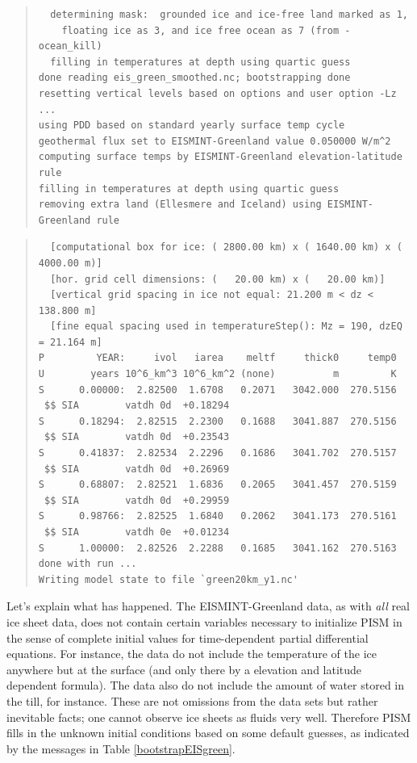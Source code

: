 \documentclass[11pt,final]{amsart}
\begin{document}
\begin{table}
\begin{quote}
\begin{verbatim}
  determining mask:  grounded ice and ice-free land marked as 1,
    floating ice as 3, and ice free ocean as 7 (from -ocean_kill)
  filling in temperatures at depth using quartic guess
done reading eis_green_smoothed.nc; bootstrapping done
resetting vertical levels based on options and user option -Lz ...
using PDD based on standard yearly surface temp cycle
geothermal flux set to EISMINT-Greenland value 0.050000 W/m^2
computing surface temps by EISMINT-Greenland elevation-latitude rule
filling in temperatures at depth using quartic guess
removing extra land (Ellesmere and Iceland) using EISMINT-Greenland rule
\end{verbatim}
\end{quote}
\normalsize
\bigskip

\caption{Bootstrapping from the EISMINT-Greenland data and running for one model year continued on next page.}
\label{bootstrapEISgreen}
\end{table}

\begin{table}
\scriptsize
\begin{quote}
\begin{verbatim}
  [computational box for ice: ( 2800.00 km) x ( 1640.00 km) x ( 4000.00 m)]
  [hor. grid cell dimensions: (   20.00 km) x (   20.00 km)]
  [vertical grid spacing in ice not equal: 21.200 m < dz < 138.800 m]
  [fine equal spacing used in temperatureStep(): Mz = 190, dzEQ = 21.164 m]
P         YEAR:     ivol   iarea    meltf     thick0     temp0
U        years 10^6_km^3 10^6_km^2 (none)          m         K
S      0.00000:  2.82500  1.6708   0.2071   3042.000  270.5156
 $$ SIA        vatdh 0d  +0.18294
S      0.18294:  2.82515  2.2300   0.1688   3041.887  270.5156
 $$ SIA        vatdh 0d  +0.23543
S      0.41837:  2.82534  2.2296   0.1686   3041.702  270.5157
 $$ SIA        vatdh 0d  +0.26969
S      0.68807:  2.82521  1.6836   0.2065   3041.457  270.5159
 $$ SIA        vatdh 0d  +0.29959
S      0.98766:  2.82525  1.6840   0.2062   3041.173  270.5161
 $$ SIA        vatdh 0e  +0.01234
S      1.00000:  2.82526  2.2288   0.1685   3041.162  270.5163
done with run ... 
Writing model state to file `green20km_y1.nc'
\end{verbatim}
\end{quote}
\normalsize
\bigskip

\caption{Continuation of Table \ref{bootstrapEISgreen}.}
\end{table}

Let's explain what has happened.  The EISMINT-Greenland data, as with \emph{all} real ice sheet data, does not contain certain variables necessary to initialize PISM in the sense of complete initial values for time-dependent partial differential equations.  For instance, the data do not include the temperature of the ice anywhere but at the surface (and only there by a elevation and latitude dependent formula).  The data also do not include the amount of water stored in the till, for instance.  These are not omissions from the data sets but rather inevitable facts; one cannot observe ice sheets as fluids very well.  Therefore PISM fills in the unknown initial conditions based on some default guesses, as indicated by the messages in Table \ref{bootstrapEISgreen}.
\end{document}
